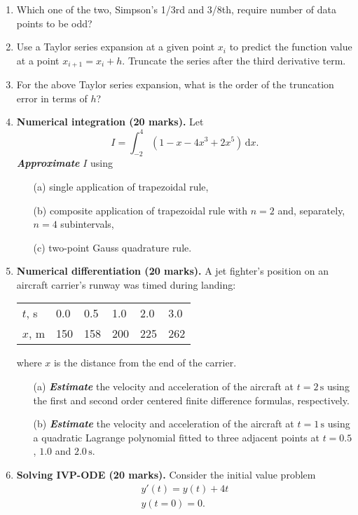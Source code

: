 \documentclass[11pt,a4paper]{article}
\newcommand{\bfit}[1]{\textit{\textbf{#1}}}
\begin{document}
\begin{enumerate}
\item Which one of the two, Simpson's 1/3rd and 3/8th, require number of data points to be odd?

\item Use a Taylor series expansion at a given point $x_i$ to predict the function value at a point $x_{i+1} = x_i + h$. Truncate the series after the third derivative term.

\item For the above Taylor series expansion, what is the order of the truncation error in terms of $h$?

\item \textbf{Numerical integration (20 marks).} Let
\[
I = \int_{-2}^4 (1 - x - 4x^3 + 2x^5)\,\mathrm{d}x .
\]
\bfit{Approximate} $I$ using
\begin{itemize}
\item[(a)] single application of trapezoidal rule,
\item[(b)] composite application of trapezoidal rule with $n=2$ and, separately,  $n=4$ subintervals,
\item[(c)] two-point Gauss quadrature rule.
\end{itemize}

\item \textbf{Numerical differentiation (20 marks).} A jet fighter's position on an aircraft carrier's runway was timed during landing:
\begin{center}
\begin{tabular}{llllll}
\hline
$t$, s \quad &0.0 &0.5 &1.0 &2.0 &3.0  \\
$x$, m \quad &150 &158 &200 &225 &262 \\
\hline
\end{tabular}
\end{center}
where $x$ is the distance from the end of the carrier.
\begin{itemize}
\item[(a)] \bfit{Estimate} the velocity and acceleration of the aircraft at $t=2\,\text{s}$ using the first and second order centered finite difference formulas, respectively.

\item[(b)] \bfit{Estimate} the velocity and acceleration of the aircraft at $t=1\,\text{s}$ using a quadratic Lagrange polynomial fitted to three adjacent points at $t=0.5$, $1.0$ and $2.0\,\text{s}$. 
\end{itemize}

\item \textbf{Solving IVP-ODE (20 marks).} Consider the initial value problem
\begin{align} \label{eqn:ivp2}
y'(t) = y(t) + 4t\\
y(t=0) = 0 .
\end{align}


\end{enumerate}
\end{document}
